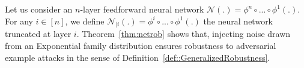 Let us consider an  $n$-layer feedforward neural network  $\mathcal{N}(.)=\phi^n\circ...\circ\phi^1(.)$. For any $i\in\left[n\right]$, we define $\mathcal{N}_{|i}(.)=\phi^i\circ...\circ\phi^1(.)$ the neural network truncated at layer $i$. Theorem~\ref{thm:netrob} shows that, injecting noise drawn from an Exponential family distribution ensures robustness to adversarial example attacks in the sense of Definition~\ref{def::GeneralizedRobustness}.











    


